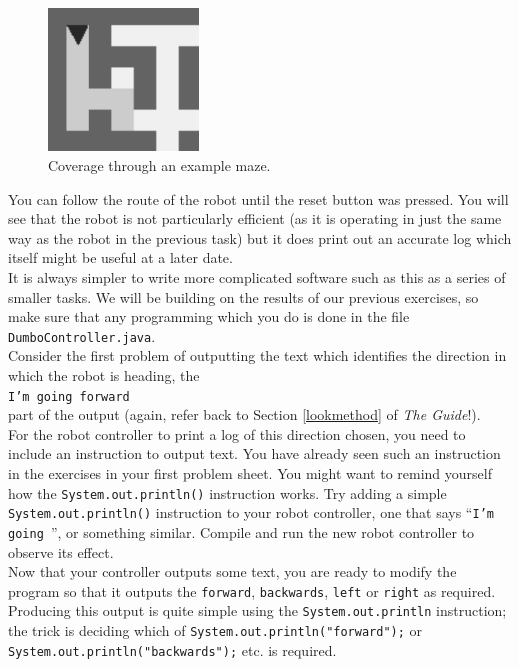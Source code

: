 \begin{figure}
\centering
\includegraphics[width=4cm]{ex7fig}
\caption{Coverage through an example maze.\label{ex7fig}}
\end{figure}

\noindent
You can follow the route of the robot until the reset button was pressed. You 
will see that the robot is not particularly efficient (as it is operating in 
just the same way as the robot in the previous task) but it does
print out an accurate log which itself might be useful at a later date.\\

\noindent
It is always simpler to write more complicated software such as this as a 
series of smaller tasks. We will be building on the results of our previous
exercises, so make sure that any programming which you do is done in the file 
{\tt DumboController.java}. \\ 

\noindent
Consider the first problem of outputting the text which identifies the 
direction in which the robot is heading, the \\

{\tt I'm going forward} \\

\noindent
part of the output (again, refer back to Section \ref{lookmethod} of {\it The Guide}!). \\

\noindent
For the robot controller to print a log of this 
direction chosen, you need to include an instruction to output
text. You have already seen such an instruction in the exercises in 
your first problem sheet. 
You might want to remind yourself how the
{\tt System.out.println()} instruction works. Try adding a simple 
{\tt System.out.println()}
instruction to your robot controller, one that says ``{\tt I'm going }'',
or something similar. Compile and run the new robot controller to
observe its effect. \\ 

\noindent
Now that your controller outputs some text, you are ready to modify the program
so that it outputs the {\tt forward}, {\tt backwards}, {\tt left} or 
{\tt right} as
required. Producing this output is quite simple using the 
{\tt System.out.println} instruction; the trick is deciding which of 
{\tt System.out.println("forward");} or 
{\tt System.out.println("backwards");} etc. is required. \\

